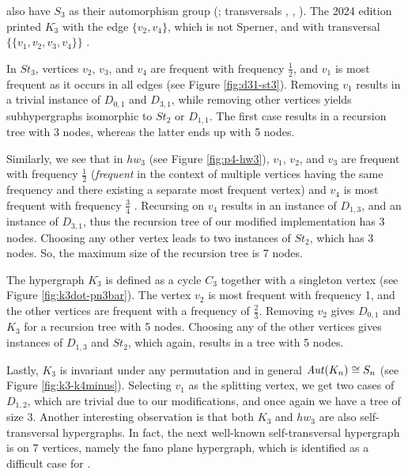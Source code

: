 also have $S_3$ as their automorphism group (; transversals , , ). The 2024 edition printed $K_3^{\cdot}$ with the edge $\{v_2,v_4\}$, which is not Sperner, and with transversal $\{\{v_1,v_2,v_3,v_4\}\}$ .

In $St_3$, vertices $v_2$, $v_3$, and $v_4$ are frequent with frequency $\frac{1}{2}$, and $v_1$ is most frequent as it occurs in all edges (see Figure \ref{fig:d31-st3}). Removing $v_1$ results in a trivial instance of $D_{0,1}$ and $D_{3,1}$, while removing other vertices yields subhypergraphs isomorphic to $St_2$ or $D_{1,1}$. The first case results in a recursion tree with 3 nodes, whereas the latter ends up with 5 nodes.

Similarly, we see that in $hw_3$ (see Figure \ref{fig:p4-hw3}), $v_1$, $v_2$, and $v_3$ are frequent with frequency $\frac{1}{2}$ (\emph{frequent} in the context of multiple vertices having the same frequency and there existing a separate most frequent vertex) and $v_4$ is most frequent with frequency $\frac{3}{4}$ . Recursing on $v_4$ results in an instance of $D_{1,3}$, and an instance of $D_{3,1}$, thus the recursion tree of our modified implementation has 3 nodes. Choosing any other vertex leads to two instances of $St_2$, which has 3 nodes. So, the maximum size of the recursion tree is 7 nodes.

The hypergraph $K_3^{\cdot}$ is defined as a cycle $C_3$ together with a singleton vertex (see Figure \ref{fig:k3dot-pn3bar}). The vertex $v_2$ is most frequent with frequency 1, and the other vertices are frequent with a frequency of $\frac{2}{3}$. Removing $v_2$ gives $D_{0,1}$ and $K_3$ for a recursion tree with 5 nodes. Choosing any of the other vertices gives instances of $D_{1,3}$ and $St_2$, which again, results in a tree with 5 nodes.

Lastly, $K_3$ is invariant under any permutation and in general $\mathit{Aut}(K_n)\cong S_n$ (see Figure \ref{fig:k3-k4minus}). Selecting $v_1$ as the splitting vertex, we get two cases of $D_{1,2}$, which are trivial due to our modifications, and once again we have a tree of size 3. Another interesting observation is that both $K_3$ and $hw_3$ are also self-transversal hypergraphs. In fact, the next well-known self-transversal hypergraph is on 7 vertices, namely the fano plane hypergraph, which is identified as a difficult case for \FKA.

